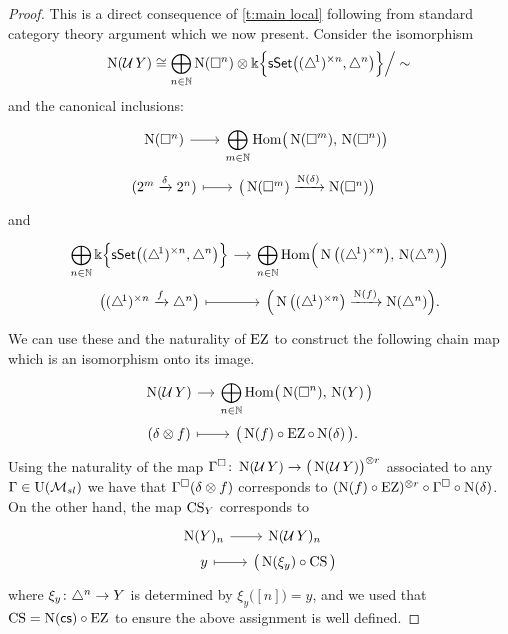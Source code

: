 \begin{proof}
	This is a direct consequence of \cref{t:main local} following from standard category theory argument which we now present.
	Consider the isomorphism
	\[
	\chains(\cubify Y) \cong \displaystyle\bigoplus_{n\in\N} \chains(\cube^n) \ot \k\set[\Big]{\sSet \big( \scube{n}, \simplex^n \big)} \Big/ \sim \,
	\]
	and the canonical inclusions:
	\[
	\begin{tikzcd} [row sep=0, column sep=small]
		\chains(\cube^n) \arrow[r] &
		\displaystyle\bigoplus_{m \in \N} \Hom \big( \chains(\cube^m),\, \chains(\cube^n) \big) \\
		(2^m \xra{\delta} 2^n) \arrow[r, mapsto] &
		\big(\chains(\cube^m) \xra{\chains(\delta)} \chains(\cube^n)\big)
	\end{tikzcd}
	\]
	and
	\[
	\begin{tikzcd} [row sep=0, column sep=small]
		\displaystyle \bigoplus_{n \in \N}
		\k\set[\Big]{\sSet\big(\scube{n}, \simplex^n\big)} \arrow[r] &
		\displaystyle \bigoplus_{n \in \N}
		\Hom \Big( \chains \big( \scube{n} \big),\, \chains(\simplex^n) \Big) \\
		\big( \scube{n} \xra{f} \simplex^n \big) \arrow[r, mapsto] &
		\Big( \chains \big( \scube{n} \big) \xra{\chains(f)} \chains(\simplex^n) \Big).
	\end{tikzcd}
	\]
	We can use these and the naturality of $\EZ$ to construct the following chain map which is an isomorphism onto its image.
	\[
	\begin{tikzcd}[column sep=small, row sep=0]
		\chains(\cubify Y) \arrow[r] &
		\displaystyle\bigoplus_{n\in\N} \Hom \big( \chains(\cube^n),\, \chains(Y)\, \big) \\
		(\delta \ot f) \arrow[r, mapsto]& \big( \chains(f) \circ \EZ \circ \chains(\delta) \, \big).
	\end{tikzcd}
	\]
	Using the naturality of the map $\Gamma^\square \colon \chains(\cubify Y) \to \big( \chains(\cubify Y) \big)^{\ot r}$ associated to any $\Gamma \in \USL$ we have that
	$\Gamma^\square(\delta \ot f)$ corresponds to $(\chains(f) \circ \EZ)^{\ot r} \circ \Gamma^\square \circ \chains(\delta)$.
	On the other hand, the map $\CS_Y$ corresponds to
	\[
	\begin{tikzcd}[column sep=small, row sep=0]
		\chains(Y)_n \arrow[r] & \chains(\cubify Y)_n \\
		y \arrow[r,mapsto]& \big( \chains(\xi_y) \circ \CS \big)
	\end{tikzcd}
	\]
	where $\xi_y \colon \simplex^n \to Y$ is determined by $\xi_y \big( [n] \big) = y$, and we used that $\CS = \chains(\ccs) \circ \EZ$ to ensure the above assignment is well defined.

\end{proof}
